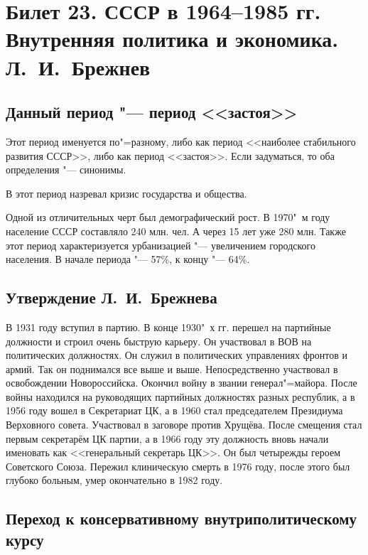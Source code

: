 \section{Билет 23. СССР в 1964--1985 гг. Внутренняя политика и экономика. Л.~И.~Брежнев}

\subsection{Данный период "--- период <<застоя>>}

Этот период именуется по"=разному, либо как период <<наиболее стабильного развития СССР>>, либо как период <<застоя>>. Если задуматься, то оба определения "--- синонимы. 

В этот период назревал кризис государства и общества. 

Одной из отличительных черт был демографический рост. В 1970"~м году население СССР составляло 240 млн. чел. А через 15 лет уже 280 млн. Также этот период характеризуется урбанизацией "--- увеличением городского населения. В начале периода "--- 57\%, к концу "--- 64\%.

\subsection{Утверждение Л.~И.~Брежнева}

В 1931 году вступил в партию. В конце 1930"~х гг. перешел на партийные должности и строил очень быструю карьеру. Он участвовал в ВОВ на политических должностях. Он служил в политических управлениях фронтов и армий. Так он поднимался все выше и выше. Непосредственно участвовал в освобождении Новороссийска. Окончил войну в звании генерал"=майора. После войны находился на руководящих партийных должностях разных республик, а в 1956 году вошел в Секретариат ЦК, а в 1960 стал председателем Президиума Верховного совета. Участвовал в заговоре против Хрущёва. После смещения стал первым секретарём ЦК партии, а в 1966 году эту должность вновь начали именовать как <<генеральный секретарь ЦК>>. Он был четырежды героем Советского Союза. Пережил клиническую смерть в 1976 году, после этого был глубоко больным, умер окончательно в 1982 году. 

\subsection{Переход к консервативному внутриполитическому курсу}

